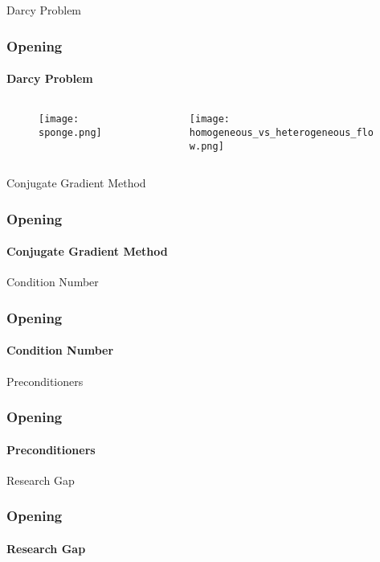 \begin{frame}[label=opening]{Darcy Problem}
    \frametitle{Opening}
    \framesubtitle{Darcy Problem}
    \begin{columns}[T]
        \begin{column}{.5\textwidth}
            \begin{figure}
                \centering
                \texttt{[image: sponge.png]}
            \end{figure}
        \end{column}
        \begin{column}{.5\textwidth}
            \begin{figure}
                \centering
                \texttt{[image: homogeneous\_vs\_heterogeneous\_flow.png]}
            \end{figure}
        \end{column}
    \end{columns}
\end{frame}

\begin{frame}[label=opening]{Conjugate Gradient Method}
    \frametitle{Opening}
    \framesubtitle{Conjugate Gradient Method}
\end{frame}

\begin{frame}[label=opening]{Condition Number}
    \frametitle{Opening}
    \framesubtitle{Condition Number}
\end{frame}

\begin{frame}[label=opening]{Preconditioners}
    \frametitle{Opening}
    \framesubtitle{Preconditioners}
\end{frame}

\begin{frame}[label=opening]{Research Gap}
    \frametitle{Opening}
    \framesubtitle{Research Gap}
\end{frame}